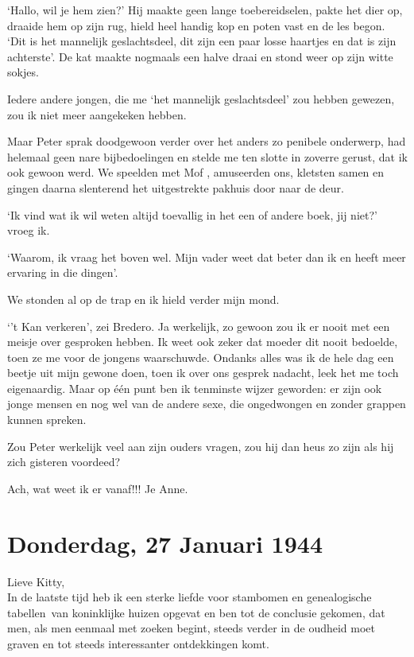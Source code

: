 \documentclass{book}
\begin{document}
`Hallo, wil je hem zien?' Hij maakte geen lange toebereidselen, pakte
het dier op, draaide hem op zijn rug, hield heel handig kop en poten
vast en de les begon. `Dit is het mannelijk geslachtsdeel, dit zijn een
paar losse haartjes en dat is zijn achterste'. De kat maakte nogmaals
een halve draai en stond weer op zijn witte sokjes.

Iedere andere jongen, die me `het mannelijk geslachtsdeel' zou hebben
gewezen, zou ik niet meer aangekeken hebben.

Maar Peter sprak doodgewoon verder over het anders zo penibele
onderwerp, had helemaal geen nare bijbedoelingen en stelde me ten slotte
in zoverre gerust, dat ik ook gewoon werd. We speelden met Mof ,
amuseerden ons, kletsten samen en gingen daarna slenterend het
uitgestrekte pakhuis door naar de deur.

`Ik vind wat ik wil weten altijd toevallig in het een of andere boek,
jij niet?' vroeg ik.

`Waarom, ik vraag het boven wel. Mijn vader weet dat beter dan ik en
heeft meer ervaring in die dingen'.

We stonden al op de trap en ik hield verder mijn mond.

`'t Kan verkeren', zei Bredero. Ja werkelijk, zo gewoon zou ik er nooit
met een meisje over gesproken hebben. Ik weet ook zeker dat moeder dit
nooit bedoelde, toen ze me voor de jongens waarschuwde. Ondanks alles
was ik de hele dag een beetje uit mijn gewone doen, toen ik over ons
gesprek nadacht, leek het me toch eigenaardig. Maar op één punt ben ik
tenminste wijzer geworden: er zijn ook jonge mensen en nog wel van de
andere sexe, die ongedwongen en zonder grappen kunnen spreken.

Zou Peter werkelijk veel aan zijn ouders vragen, zou hij dan heus zo
zijn als hij zich gisteren voordeed?

Ach, wat weet ik er vanaf!!! Je Anne.

\chapter{Donderdag, 27 Januari 1944}

Lieve Kitty,\\In de laatste tijd heb ik een sterke liefde voor stambomen
en genealogische tabellen~van koninklijke huizen opgevat en ben tot de
conclusie gekomen, dat men, als men eenmaal met zoeken begint, steeds
verder in de oudheid moet graven en tot steeds interessanter
ontdekkingen komt.
\end{document}

